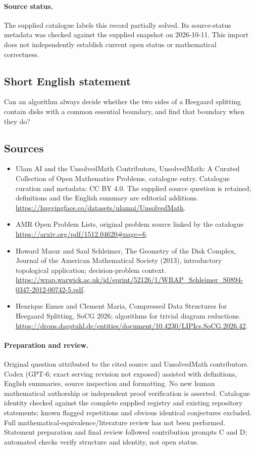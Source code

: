 \documentclass[11pt]{article}
\begin{document}
\paragraph{Source status.}
The supplied catalogue labels this record partially solved. Its source-status metadata was checked against the supplied snapshot on 2026-10-11. This import does not independently establish current open status or mathematical correctness.
\subsection{Short English statement}
Can an algorithm always decide whether the two sides of a Heegaard splitting contain disks with a common essential boundary, and find that boundary when they do?
\subsection{Sources}
\begin{itemize}
\item[\hypertarget{source:statement:1}{S1}] Ulam AI and the UnsolvedMath Contributors, UnsolvedMath: A Curated Collection of Open Mathematics Problems, catalogue entry. Catalogue curation and metadata: CC BY 4.0. The supplied source question is retained; definitions and the English summary are editorial additions.
\url{https://huggingface.co/datasets/ulamai/UnsolvedMath}.
\item[\hypertarget{source:statement:2}{S2}] AMR Open Problem Lists, original problem source linked by the catalogue
\url{https://arxiv.org/pdf/1512.04620#page=6}.
\item[\hypertarget{source:statement:3}{S3}] Howard Masur and Saul Schleimer, The Geometry of the Disk Complex, Journal of the American Mathematical Society (2013), introductory topological application; decision-problem context.
\url{https://wrap.warwick.ac.uk/id/eprint/52126/1/WRAP_Schleimer_S0894-0347-2012-00742-5.pdf}.
\item[\hypertarget{source:statement:4}{S4}] Henrique Ennes and Clement Maria, Compressed Data Structures for Heegaard Splitting, SoCG 2026; algorithms for trivial diagram reductions.
\url{https://drops.dagstuhl.de/entities/document/10.4230/LIPIcs.SoCG.2026.42}.
\end{itemize}
\paragraph{Preparation and review.}
Original question attributed to the cited source and UnsolvedMath contributors. Codex (GPT-6; exact serving revision not exposed) assisted with definitions, English summaries, source inspection and formatting. No new human mathematical authorship or independent proof verification is asserted. Catalogue identity checked against the complete supplied registry and existing repository statements; known flagged repetitions and obvious identical conjectures excluded. Full mathematical-equivalence/literature review has not been performed. Statement preparation and final review followed contribution prompts C and D; automated checks verify structure and identity, not open status.
\label{end:statement}
\end{document}

